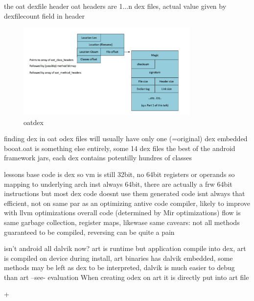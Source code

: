 the oat dexfile header
oat headers are 1...n dex files, actual value given by dexfilecount field in header
\begin{figure}[h]
    \centering
    \includegraphics[width=0.8\textwidth]{data/oatdex.png}
    \caption{oatdex}
    \label{fig:awesome_image122223}
\end{figure}


finding dex in oat
odex files will usually have only one (=original) dex embedded
booat.oat is something else entirely, some 14 dex files the best of the android framework jars, each dex contains potentilly hundres of classes



lessons
base code is dex so vm is still 32bit, no 64bit registers or operands so mapping to underlying arch inst always 64bit, there are actually a frw 64bit instructions but most dex code doesnt use them
generated code isnt always that efficient, not on same par as an optimizing antive code compiler, likely to improve with llvm optimizations
overall code (determined by Mir optimizations) flow is same
garbage collection, register maps, likewase same
cavears: not all methods guaranteed to be compiled, reversing can be quite a pain
\newline


isn't android all dalvik now?
art is runtime but application compile into dex, art is compiled on device during install, art binaries has dalvik embedded, some methods may be left as dex to be interpreted, dalvik is much easier to debug than art --see- evaluation \newline
\cite{andevconDalvikART}
%
When creating odex on art it is directly put into art file

+

